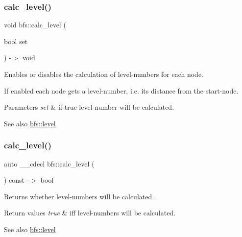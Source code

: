 \subsubsection{\texorpdfstring{calc\+\_\+level()}{calc\_level()}\hspace{0.1cm}{\footnotesize\ttfamily [1/2]}}
{\footnotesize\ttfamily void bfs\+::calc\+\_\+level (\begin{DoxyParamCaption}\item[{bool}]{set }\end{DoxyParamCaption}) -\/$>$ void}



Enables or disables the calculation of level-\/numbers for each node. 

If enabled each node gets a level-\/number, i.\+e. its distance from the start-\/node.


\begin{DoxyParams}{Parameters}
{\em set} & if true level-\/number will be calculated. \\
\hline
\end{DoxyParams}
\begin{DoxySeeAlso}{See also}
\mbox{\hyperlink{classbfs_a9c2effb945b67f73b3abe33682df139f}{bfs\+::level}} 
\end{DoxySeeAlso}
\mbox{\label{classbfs_a2d36d5c58653acfb219bed569e399a51}} 
\subsubsection{\texorpdfstring{calc\+\_\+level()}{calc\_level()}\hspace{0.1cm}{\footnotesize\ttfamily [2/2]}}
{\footnotesize\ttfamily auto \+\_\+\+\_\+cdecl bfs\+::calc\+\_\+level (\begin{DoxyParamCaption}{ }\end{DoxyParamCaption}) const -\/$>$ bool \hspace{0.3cm}{\ttfamily [inline]}}



Returns whether level-\/numbers will be calculated. 


\begin{DoxyRetVals}{Return values}
{\em true} & iff level-\/numbers will be calculated. \\
\hline
\end{DoxyRetVals}
\begin{DoxySeeAlso}{See also}
\mbox{\hyperlink{classbfs_a9c2effb945b67f73b3abe33682df139f}{bfs\+::level}} 
\end{DoxySeeAlso}
\mbox{\label{classbfs_a57bc562775d63c4bbec63ee403e0fde7}} 
